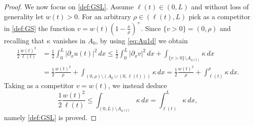 \documentclass[a4paper,11pt,reqno]{amsart}
\numberwithin{equation}{section}
\theoremstyle{definition}
\theoremstyle{remark}
\begin{document}
\begin{proof}
        We now focus on \ref{def:GSL}. Assume $\ell(t)\in (0,L)$ and without loss of generality let $w(t)>0$. For an arbitrary $\rho\in (\ell(t),L)$ pick as a competitor in \ref{def:GS} the function $v=w(t)\left(1-\frac{x}{\rho}\right)^+$. Since $\{v>0\}= (0,\rho)$ and recalling that $\kappa$ vanishes in $A_0$, by using \eqref{eq:Au1d} we obtain
        \begin{align}
            \frac 12 \frac{w(t)^2}{\ell(t)}&=\frac 12 \int_0^L |\partial_x u(t)|^2\, dx\le \frac 12\int_0^{L}|\partial_x v|^2\, dx+\int_{\{v>0\}\setminus A_{u(t)}}\kappa \, dx \\
                                           & =  \frac 12 \frac{w(t)^2}{\rho}+ \int_{(0,\rho)\setminus (A_0\cup (0,\ell(t)))}\!\!\!\!\!\kappa \, dx = \frac 12 \frac{w(t)^2}{\rho}+ \int_{\ell(t)}^\rho \kappa \, dx.
        \end{align}
        Taking as a competitor $v=w(t)$, we instead deduce
        \begin{equation}
            \frac 12 \frac{w(t)^2}{\ell(t)}\le \int_{(0,L)\setminus A_{u(t)}}\kappa \, dx= \int_{\ell(t)}^L \kappa\, dx,
        \end{equation}
        namely \ref{def:GSL} is proved.


\end{proof}
\end{document}
